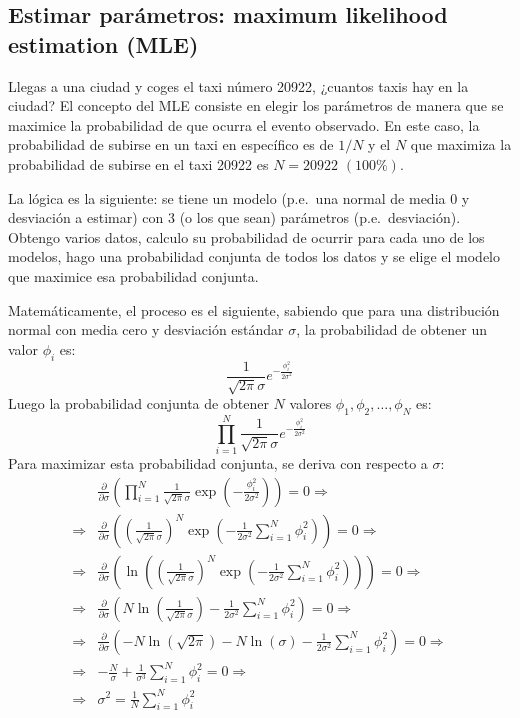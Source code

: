 \subsection{Estimar parámetros: maximum likelihood estimation (MLE)}
Llegas a una ciudad y coges el taxi número 20922, ¿cuantos taxis hay en la ciudad? El concepto del MLE consiste en elegir los parámetros de manera que se maximice la probabilidad de que ocurra el evento observado. En este caso, la probabilidad de subirse en un taxi en específico es de $1/N$ y el $N$ que maximiza la probabilidad de subirse en el taxi 20922 es $N=20922$ $(100\%)$.

La lógica es la siguiente: se tiene un modelo (p.e.\ una normal de media 0 y desviación a estimar) con 3 (o los que sean) parámetros (p.e.\ desviación). Obtengo varios datos, calculo su probabilidad de ocurrir para cada uno de los modelos, hago una probabilidad conjunta de todos los datos y se elige el modelo que maximice esa probabilidad conjunta.

Matemáticamente, el proceso es el siguiente, sabiendo que para una distribución normal con media cero y desviación estándar $\sigma$, la probabilidad de obtener un valor $\phi_i$ es:
\[
\frac{1}{\sqrt{2\pi}\sigma} e^{-\frac{\phi_i^2}{2\sigma^2}}
\]
Luego la probabilidad conjunta de obtener $N$ valores $\phi_1, \phi_2, \dots, \phi_N$ es:
\[
\prod_{i=1}^N \frac{1}{\sqrt{2\pi}\sigma} e^{-\frac{\phi_i^2}{2\sigma^2}}
\]
Para maximizar esta probabilidad conjunta, se deriva con respecto a $\sigma$:
\begin{align*}
    &\frac{\partial}{\partial \sigma} \left( \prod_{i=1}^N \frac{1}{\sqrt{2\pi}\sigma} \exp\left(-\frac{\phi_i^2}{2\sigma^2}\right) \right) = 0 \Rightarrow \\
    \Rightarrow &\frac{\partial}{\partial \sigma} \left( \left( \frac{1}{\sqrt{2\pi}\sigma} \right)^N \exp\left(-\frac{1}{2\sigma^2} \sum_{i=1}^N \phi_i^2\right) \right) = 0 \Rightarrow \\
    \Rightarrow &\frac{\partial}{\partial \sigma} \left( \ln\left(\left( \frac{1}{\sqrt{2\pi}\sigma} \right)^N \exp\left(-\frac{1}{2\sigma^2} \sum_{i=1}^N \phi_i^2\right)\right) \right) = 0 \Rightarrow \\
    \Rightarrow &\frac{\partial}{\partial \sigma} \left( N\ln\left(\frac{1}{\sqrt{2\pi}\sigma}\right) - \frac{1}{2\sigma^2} \sum_{i=1}^N \phi_i^2 \right) = 0 \Rightarrow \\
    \Rightarrow &\frac{\partial}{\partial \sigma} \left( -N\ln\left(\sqrt{2\pi}\right) -N\ln\left(\sigma\right) - \frac{1}{2\sigma^2} \sum_{i=1}^N \phi_i^2 \right) = 0 \Rightarrow \\
    \Rightarrow &-\frac{N}{\sigma} + \frac{1}{\sigma^3} \sum_{i=1}^N \phi_i^2 = 0 \Rightarrow \\
    \Rightarrow &\sigma^2 = \frac{1}{N} \sum_{i=1}^N \phi_i^2
\end{align*}







